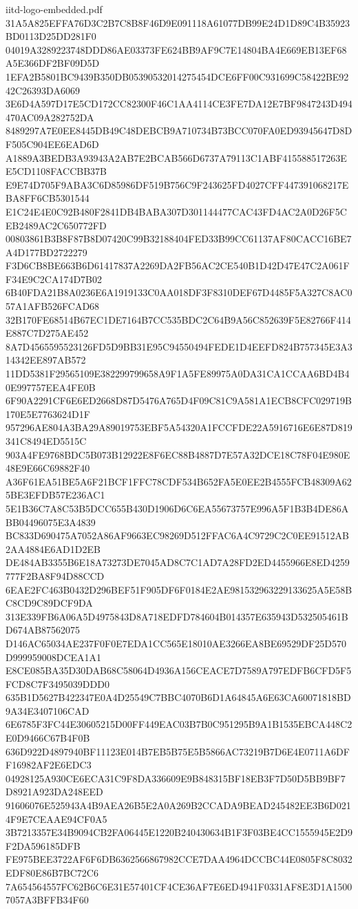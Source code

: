 \begin{filecontents*}[overwrite]{iitd-logo-embedded.pdf}
31A5A825EFFA76D3C2B7C8B8F46D9E091118A61077DB99E24D1D89C4B35923BD0113D25DD281F0
04019A3289223748DDD86AE03373FE624BB9AF9C7E14804BA4E669EB13EF68A5E366DF2BF09D5D
1EFA2B5801BC9439B350DB05390532014275454DCE6FF00C931699C58422BE9242C26393DA6069
3E6D4A597D17E5CD172CC82300F46C1AA4114CE3FE7DA12E7BF9847243D494470AC09A282752DA
8489297A7E0EE8445DB49C48DEBCB9A710734B73BCC070FA0ED93945647D8DF505C904EE6EAD6D
A1889A3BEDB3A93943A2AB7E2BCAB566D6737A79113C1ABF415588517263EE5CD1108FACCBB37B
E9E74D705F9ABA3C6D85986DF519B756C9F243625FD4027CFF447391068217EBA8FF6CB5301544
E1C24E4E0C92B480F2841DB4BABA307D301144477CAC43FD4AC2A0D26F5CEB2489AC2C650772FD
00803861B3B8F87B8D07420C99B32188404FED33B99CC61137AF80CACC16BE7A4D177BD2722279
F3D6CB8BE663B6D61417837A2269DA2FB56AC2CE540B1D42D47E47C2A061FF34E9C2CA174D7B02
6B40FDA21B8A0236E6A1919133C0AA018DF3F8310DEF67D4485F5A327C8AC057A1AFB526FCAD68
32B170FE68514B67EC1DE7164B7CC535BDC2C64B9A56C852639F5E82766F414E887C7D275AE452
8A7D4565595523126FD5D9BB31E95C94550494FEDE1D4EEFD824B757345E3A314342EE897AB572
11DD5381F29565109E382299799658A9F1A5FE89975A0DA31CA1CCAA6BD4B40E997757EEA4FE0B
6F90A2291CF6E6ED2668D87D5476A765D4F09C81C9A581A1ECB8CFC029719B170E5E7763624D1F
957296AE804A3BA29A89019753EBF5A54320A1FCCFDE22A5916716E6E87D819341C8494ED5515C
903A4FE9768BDC5B073B12922E8F6EC88B4887D7E57A32DCE18C78F04E980E48E9E66C69882F40
A36F61EA51BE5A6F21BCF1FFC78CDF534B652FA5E0EE2B4555FCB48309A625BE3EFDB57E236AC1
5E1B36C7A8C53B5DCC655B430D1906D6C6EA55673757E996A5F1B3B4DE86ABB04496075E3A4839
BC833D690475A7052A86AF9663EC98269D512FFAC6A4C9729C2C0EE91512AB2AA4884E6AD1D2EB
DE484AB3355B6E18A73273DE7045AD8C7C1AD7A28FD2ED4455966E8ED4259777F2BA8F94D88CCD
6EAE2FC463B0432D296BEF51F905DF6F0184E2AE981532963229133625A5E58BC8CD9C89DCF9DA
313E339FB6A06A5D4975843D8A718EDFD784604B014357E635943D532505461BD674AB87562075
D146AC65034AE237F0F0E7EDA1CC565E18010AE3266EA8BE69529DF25D570D999959008DCEA1A1
E8CE085BA35D30DAB68C58064D4936A156CEACE7D7589A797EDFB6CFD5F5FCD8C7F3495039DDD0
635B1D5627B422347E0A4D25549C7BBC4070B6D1A64845A6E63CA60071818BD9A34E3407106CAD
6E6785F3FC44E30605215D00FF449EAC03B7B0C951295B9A1B1535EBCA448C2E0D9466C67B4F0B
636D922D4897940BF11123E014B7EB5B75E5B5866AC73219B7D6E4E0711A6DFF16982AF2E6EDC3
04928125A930CE6ECA31C9F8DA336609E9B848315BF18EB3F7D50D5BB9BF7D8921A923DA248EED
91606076E525943A4B9AEA26B5E2A0A269B2CCADA9BEAD245482EE3B6D0214F9E7CEAAE94CF0A5
3B7213357E34B9094CB2FA06445E1220B240430634B1F3F03BE4CC1555945E2D9F2DA596185DFB
FE975BEE3722AF6F6DB6362566867982CCE7DAA4964DCCBC44E0805F8C8032EDF80E86B7BC72C6
7A654564557FC62B6C6E31E57401CF4CE36AF7E6ED4941F0331AF8E3D1A15007057A3BFFB34F60

\end{filecontents*}
